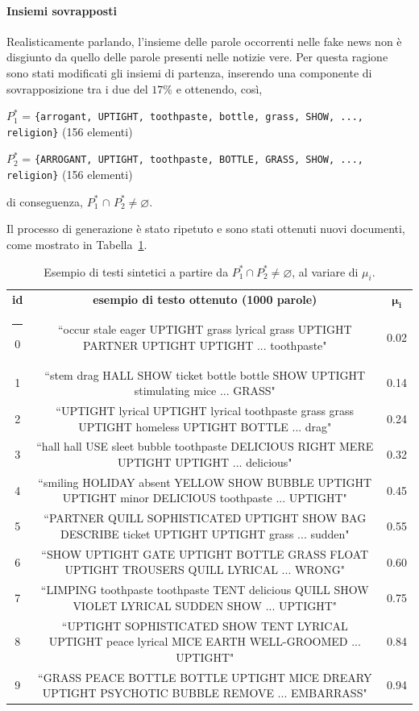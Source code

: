 \documentclass[12pt]{report}
\makeatletter
\theoremstyle{definition}
\newcommand{\thickhline}{%
    \noalign {\ifnum 0=`}\fi \hrule height 1pt
    \futurelet \reserved@a \@xhline
}
\let\emptyset\varnothing
\makeatother
\begin{document}
\paragraph{Insiemi sovrapposti}
Realisticamente parlando, l'insieme delle parole occorrenti nelle fake news non è disgiunto da quello delle parole presenti nelle notizie vere.
Per questa ragione sono stati modificati gli insiemi di partenza, inserendo una componente di sovrapposizione tra i due del $17 \%$ e ottenendo, così,
\begin{center}
    $P_{1}^{*}$ = \texttt{\{arrogant, UPTIGHT, toothpaste, bottle, grass, SHOW, ..., religion\}} (156 elementi)
\end{center}
\begin{center}
    $P_{2}^{*}$ = \texttt{\{ARROGANT, UPTIGHT, toothpaste, BOTTLE, GRASS, SHOW, ..., religion\}} (156 elementi)
\end{center}
di conseguenza, $P_{1}^{*}$ $\cap$ $P_{2}^{*} \neq \emptyset$.

Il processo di generazione è stato ripetuto e sono stati ottenuti nuovi documenti, come mostrato in Tabella~\ref{generationexample2}.
\begin{table}
\centering
\begin{adjustbox}{max width=\textwidth}
 \begin{tabular}{|c|c|c|} 
 \hline
\textbf{id} & \textbf{esempio di testo ottenuto (1000 parole)} & $\bm{\mu_i}$ 
\\ [0.5ex] 
 \thickhline
0 & ``occur stale eager UPTIGHT grass lyrical grass UPTIGHT PARTNER UPTIGHT UPTIGHT ... toothpaste" & 0.02 \\
1 & ``stem drag HALL SHOW ticket bottle bottle SHOW UPTIGHT stimulating mice ... GRASS" & 0.14  \\
2 & ``UPTIGHT lyrical UPTIGHT lyrical toothpaste grass grass UPTIGHT homeless UPTIGHT BOTTLE ... drag" & 0.24 \\
3 & ``hall hall USE sleet bubble toothpaste DELICIOUS RIGHT MERE UPTIGHT UPTIGHT ... delicious" & 0.32 \\
4 & ``smiling HOLIDAY absent YELLOW SHOW BUBBLE UPTIGHT UPTIGHT minor DELICIOUS toothpaste ... UPTIGHT" & 0.45 \\
5 & ``PARTNER QUILL SOPHISTICATED UPTIGHT SHOW BAG DESCRIBE ticket UPTIGHT UPTIGHT grass ... sudden" & 0.55 \\
6 & ``SHOW UPTIGHT GATE UPTIGHT BOTTLE GRASS FLOAT UPTIGHT TROUSERS QUILL LYRICAL ... WRONG" & 0.60  \\
7 & ``LIMPING toothpaste toothpaste TENT delicious QUILL SHOW VIOLET LYRICAL SUDDEN SHOW ... UPTIGHT" & 0.75 \\
8 & ``UPTIGHT SOPHISTICATED SHOW TENT LYRICAL UPTIGHT peace lyrical MICE EARTH WELL-GROOMED ... UPTIGHT" & 0.84 \\
9 & ``GRASS PEACE BOTTLE BOTTLE UPTIGHT MICE DREARY UPTIGHT PSYCHOTIC BUBBLE REMOVE ... EMBARRASS" & 0.94 \\
 \hline
\end{tabular}
\end{adjustbox}
\caption{Esempio di testi sintetici a partire da $P_{1}^{*} \cap P_{2}^{*} \neq \emptyset$, al variare di $\mu_i$.}
\label{generationexample2}
\end{table}
\end{document}
